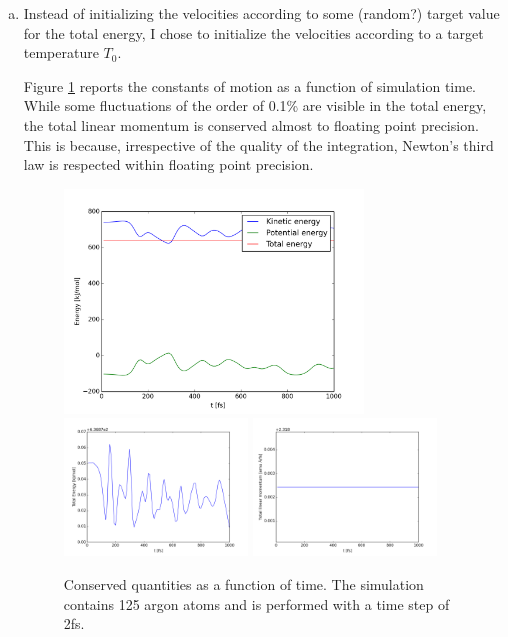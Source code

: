 \documentclass{scrartcl}
\begin{document}
\begin{enumerate}[a)]
    \item Instead of initializing the velocities according to some (random?) 
        target value for the total energy,
        I chose to initialize the velocities according to a target temperature
        $T_0$.

    Figure \ref{fig:cons} reports the constants of motion as a function 
    of simulation time. While some fluctuations of the order of
    0.1\% are visible in the total energy, the total linear momentum is
    conserved almost to floating point precision.
    This is because, irrespective of the quality of the integration,
    Newton's third law is respected within floating point precision.
\begin{figure}[h]
    \centering
    \includegraphics[width=0.75\textwidth]{images/energies}
    \includegraphics[width=0.46\textwidth]{images/etot}
    \includegraphics[width=0.46\textwidth]{images/ptot}
    \caption{Conserved quantities as a function of time.
             The simulation contains 125 argon atoms and is performed
             with a time step of 2fs.}
    \label{fig:cons}
\end{figure}


\end{enumerate}
\end{document}
